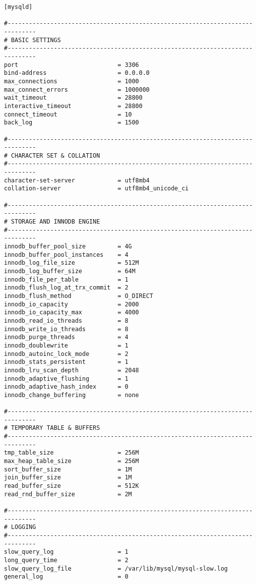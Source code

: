 \begin{lstlisting}[caption={MariaDB configuration file}, label={lst:mariadb-config}]
[mysqld]

#------------------------------------------------------------------------------
# BASIC SETTINGS             
#------------------------------------------------------------------------------
port                            = 3306
bind-address                    = 0.0.0.0
max_connections                 = 1000
max_connect_errors              = 1000000
wait_timeout                    = 28800
interactive_timeout             = 28800
connect_timeout                 = 10
back_log                        = 1500

#------------------------------------------------------------------------------
# CHARACTER SET & COLLATION
#------------------------------------------------------------------------------
character-set-server            = utf8mb4
collation-server                = utf8mb4_unicode_ci

#------------------------------------------------------------------------------
# STORAGE AND INNODB ENGINE
#------------------------------------------------------------------------------
innodb_buffer_pool_size         = 4G
innodb_buffer_pool_instances    = 4
innodb_log_file_size            = 512M
innodb_log_buffer_size          = 64M
innodb_file_per_table           = 1
innodb_flush_log_at_trx_commit  = 2
innodb_flush_method             = O_DIRECT
innodb_io_capacity              = 2000
innodb_io_capacity_max          = 4000
innodb_read_io_threads          = 8
innodb_write_io_threads         = 8
innodb_purge_threads            = 4
innodb_doublewrite              = 1
innodb_autoinc_lock_mode        = 2
innodb_stats_persistent         = 1
innodb_lru_scan_depth           = 2048
innodb_adaptive_flushing        = 1
innodb_adaptive_hash_index      = 0
innodb_change_buffering         = none

#------------------------------------------------------------------------------
# TEMPORARY TABLE & BUFFERS
#------------------------------------------------------------------------------
tmp_table_size                  = 256M
max_heap_table_size             = 256M
sort_buffer_size                = 1M
join_buffer_size                = 1M
read_buffer_size                = 512K
read_rnd_buffer_size            = 2M

#------------------------------------------------------------------------------
# LOGGING
#------------------------------------------------------------------------------
slow_query_log                  = 1
long_query_time                 = 2
slow_query_log_file             = /var/lib/mysql/mysql-slow.log
general_log                     = 0


\end{lstlisting}
